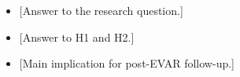 \begin{itemize}
    \item {[}Answer to the research question.]
    \item {[}Answer to H1 and H2.]
    \item {[}Main implication for post-EVAR follow-up.]
\end{itemize}
